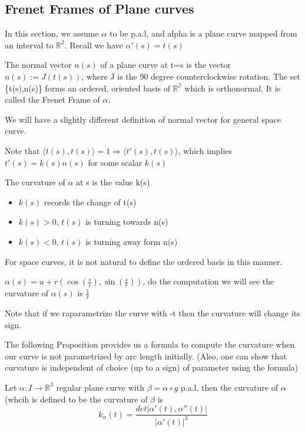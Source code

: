 \documentclass{article}
\begin{document}
\subsection{Frenet Frames of Plane curves}
In this section, we assume $\alpha$ to be p.a.l, and alpha is a plane curve mapped from an interval to $\mathbb{R}^2$. Recall we have $\alpha'(s)=t(s)$
\begin{definition}
    The normal vector $n(s)$ of a plane curve at t=s is the vector $n(s):=J(t(s))$, where J is the 90 degree counterclockwise rotation. The set \{t(s),n(s)\} forms an ordered, oriented basis of $\mathbb{R^2}$ which is orthonormal. It is called the Frenet Frame of $\alpha$.
\end{definition}
\begin{remark}
    We will have a slightly different definition of normal vector for general space curve.
\end{remark}
Note that $\langle t(s),t(s)\rangle=1 \Rightarrow\langle t'(s),t(s)\rangle$, which implies $t'(s)=k(s)n(s)$ for some scalar $k(s)$

\begin{definition}
    The curvature of $\alpha$ at s is the value k(s)
\end{definition}
\begin{remark}
    \begin{itemize}
        \item $k(s)$ records the change of t(s)
        \item $k(s)>0$, $t(s)$ is turning towards n(s)
        \item $k(s)<0$, $t(s)$ is turning away form n(s)
    \end{itemize}
    For space curves, it is not natural to define the ordered basis in this manner.
\end{remark}
\begin{example}[circle]
    $\alpha(s)=u+r(\cos(\frac{s}{r}),\sin(\frac{s}{r}))$, do the computation we will see the curvature of $\alpha(s)$ is $\frac{1}{r}$

    Note that if we raparametrize the curve with -t then the curvature will change its sign.
\end{example}
The following Proposition provides us a formula to compute the curvature when our curve is not parametrized by arc length initially. (Also, one can show that curvature is independent of choice (up to a sign) of parameter using the formula)
\begin{proposition}
    Let $\alpha: I\to \mathbb{R}^3$ regular plane curve with $\beta=\alpha\circ g$ p.a.l, then the curvature of $\alpha$ (whcih is defined to be the curvature of $\beta$ is \[k_{\alpha}(t)=\frac{det|\alpha'(t),\alpha''(t)|}{|\alpha'(t)|^3}\]
\end{proposition}
\end{document}
